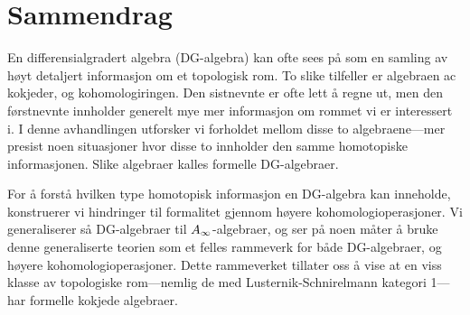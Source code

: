 

\section{Sammendrag}

En differensialgradert algebra (DG-algebra) kan ofte sees på som en samling av høyt detaljert informasjon om et topologisk rom. To slike tilfeller er algebraen ac kokjeder, og kohomologiringen. Den sistnevnte er ofte lett å regne ut, men den førstnevnte innholder generelt mye mer informasjon om rommet vi er interessert i. I denne avhandlingen utforsker vi forholdet mellom disse to algebraene---mer presist noen situasjoner hvor disse to innholder den samme homotopiske informasjonen. Slike algebraer kalles formelle DG-algebraer. 

For å forstå hvilken type homotopisk informasjon en DG-algebra kan inneholde, konstruerer vi hindringer til formalitet gjennom høyere kohomologioperasjoner. Vi generaliserer så DG-algebraer til $A_{\infty}$-algebraer, og ser på noen måter å bruke denne generaliserte teorien som et felles rammeverk for både DG-algebraer, og høyere kohomologioperasjoner. Dette rammeverket tillater oss å vise at en viss klasse av topologiske rom---nemlig de med Lusternik-Schnirelmann kategori 1---har formelle kokjede algebraer. 